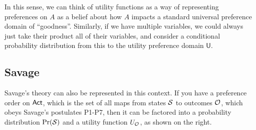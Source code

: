 \documentclass{article}
\begin{document}
	\begin{center}
	\end{center}
	
	In this sense, we can think of utility functions as a way of representing preferences on $A$ as a belief about how $A$ impacts a standard universal preference domain of ``goodness''. Similarly, if we have multiple variables, we could always just take their product all of their variables, and consider a conditional probability distribution from this to the utility preference domain $\mathsf U $.
	
	\begin{center}
	\end{center}
	
	
	\subsection{Savage}
	\begin{minipage}{\linewidth-5.5cm}
		Savage's theory can also be represented in this context. If you have a preference order on $\sf Act$, which is the set of all maps from states $\cal S$ to outcomes $\cal O$, which obeys Savage's postulates P1-P7, then it can be factored into a probability distribution $\Pr(\cal S)$ and a utility function $U_{\cal O}$, as shown on the right.
	\end{minipage}\hfill
	\begin{minipage}{5cm}
	\end{minipage}
	
\end{document}
